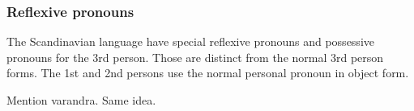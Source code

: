 \documentclass{report}
\begin{document}
\subsubsection*{Reflexive pronouns}
\label{swe:refl}
The Scandinavian language have special reflexive pronouns
and possessive pronouns for the 3rd
person\cite[ \& 319]{H&H}. Those are distinct from the normal 3rd person forms.
The 1st and 2nd persons use the normal personal pronoun in object form.

Mention varandra. Same idea.
\end{document}
